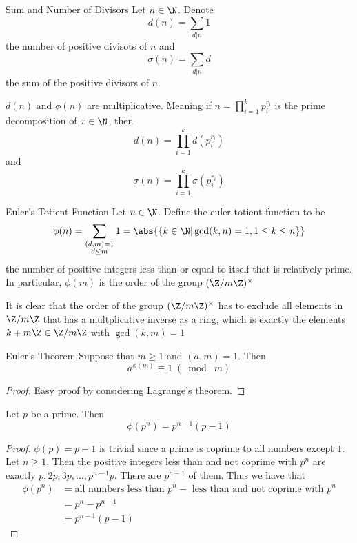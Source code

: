 \begin{defn}{Sum and Number of Divisors}{} Let $n\in\N$. Denote $$d(n)=\sum_{d|n}1$$ the number of positive divisots of $n$ and $$\sigma(n)=\sum_{d|n}d$$ the sum of the positive divisors of $n$. 
\end{defn}

\begin{thm}{}{} $d(n)$ and $\phi(n)$ are multiplicative. Meaning if $n=\prod_{i=1}^kp_i^{r_i}$ is the prime decomposition of $x\in\N$, then $$d(n)=\prod_{i=1}^kd(p_i^{r_i})$$ and $$\sigma(n)=\prod_{i=1}^k\sigma(p_i^{r_i})$$
\end{thm}

\begin{defn}{Euler's Totient Function}{} Let $n\in\N$. Define the euler totient function to be $$\phi(n)=\sum_{\substack{(d,m)=1\\d\leq m}}1=\abs{\{k\in\N|\gcd(k,n)=1,1\leq k\leq n\}}$$ the number of positive integers less than or equal to itself that is relatively prime. In particular, $\phi(m)$ is the order of the group $(\Z/m\Z)^\times$
\end{defn}

It is clear that the order of the group $(\Z/m\Z)^\times$ has to exclude all elements in $\Z/m\Z$ that has a multplicative inverse as a ring, which is exactly the elements $k+m\Z\in\Z/m\Z$ with $\gcd(k,m)=1$

\begin{thm}{Euler's Theorem}{} Suppose that $m\geq 1$ and $(a,m)=1$. Then $$a^{\phi(m)}\equiv 1\;(\bmod\;m)$$\tcbline\begin{proof}
Easy proof by considering Lagrange's theorem. 
\end{proof}
\end{thm}

\begin{lmm}{}{} Let $p$ be a prime. Then $$\phi(p^n)=p^{n-1}(p-1)$$\tcbline
\begin{proof}
$\phi(p)=p-1$ is trivial since a prime is coprime to all numbers except $1$. Let $n\geq 1$, Then the positive integers less than and not coprime with $p^n$ are exactly $p,2p,3p,\dots,p^{n-1}p$. There are $p^{n-1}$ of them. Thus we have that 
\begin{align*}
\phi(p^n)&=\text{all numbers less than }p^n-\text{ less than and not coprime with }p^n\\
&=p^n-p^{n-1}\\
&=p^{n-1}(p-1)
\end{align*}
\end{proof}
\end{lmm}

